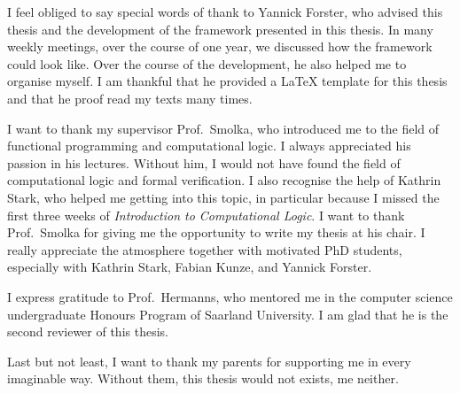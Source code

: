 I feel obliged to say special words of thank to Yannick Forster, who advised this thesis and the development of the framework presented in this
thesis.  In many weekly meetings, over the course of one year, we discussed how the framework could look like.  Over the course of the development, he
also helped me to organise myself.  I am thankful that he provided a {\LaTeX} template for this thesis and that he proof read my texts many times.

I want to thank my supervisor Prof.~Smolka, who introduced me to the field of functional programming and computational logic.  I always appreciated
his passion in his lectures.  Without him, I would not have found the field of computational logic and formal verification.  I also recognise the help
of Kathrin Stark, who helped me getting into this topic, in particular because I missed the first three weeks of \textit{Introduction to Computational
  Logic}.  I want to thank Prof.~Smolka for giving me the opportunity to write my thesis at his chair.  I really appreciate the atmosphere together
with motivated PhD students, especially with Kathrin Stark, Fabian Kunze, and Yannick Forster.

I express gratitude to Prof.~Hermanns, who mentored me in the computer science undergraduate Honours Program of Saarland University.  I am glad that
he is the second reviewer of this thesis.

Last but not least, I want to thank my parents for supporting me in every imaginable way.  Without them, this thesis would not exists, me neither.



